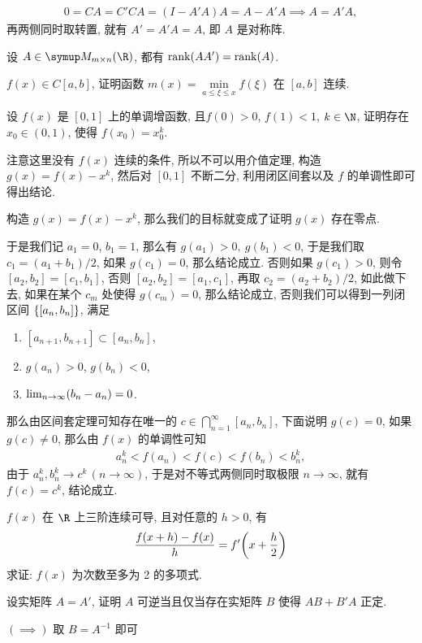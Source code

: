 \begin{exercise}[series=exer]
\begin{answer}
      \begin{align*}
          0 = CA = C'CA = (I - A'A)A = A - A'A \implies A = A'A,
      \end{align*}
      再两侧同时取转置, 就有 $ A' = A'A = A $, 即 $ A $ 是对称阵.
  \end{answer}
  \item 设 $ A \in \MM[\R][m \times n] $, 都有 $ \rank(AA') = \rank(A) $.
  \item $ f(x) \in C[a, b] $, 证明函数 $ m(x) = \min\limits_{a \le \xi \le x}f(\xi) $ 在 $ [a, b] $ 连续.
  \item 设 $ f(x) $ 是 $ [0, 1] $ 上的单调增函数, 且$ f(0) > 0 $, $ f(1) < 1 $, $ k \in \N $, 证明存在 $ x_{0} \in (0, 1) $, 使得 $ f(x_{0}) = x_{0}^{k} $.
  \begin{hint}
      注意这里没有 $ f(x) $ 连续的条件, 所以不可以用介值定理, 构造 $ g(x) = f(x) - x^{k} $, 然后对 $ [0, 1] $ 不断二分, 利用闭区间套以及 $ f $ 的单调性即可得出结论.
  \end{hint}
  \begin{answer}
      构造 $ g(x) = f(x) - x^{k} $, 那么我们的目标就变成了证明 $ g(x) $ 存在零点.

      于是我们记 $ a_{1} = 0 $, $ b_{1} = 1 $, 那么有 $ g(a_{1}) > 0,\ g(b_{1}) < 0 $, 于是我们取 $ c_{1} = (a_{1} + b_{1})/2 $, 如果 $ g(c_{1}) = 0 $, 那么结论成立. 否则如果 $ g(c_{1}) > 0 $, 则令 $ [a_{2}, b_{2}] = [c_{1}, b_{1}] $, 否则 $ [a_{2}, b_{2}] = [a_{1}, c_{1}] $, 再取 $ c_{2} = (a_{2} + b_{2})/2 $, 如此做下去, 如果在某个 $ c_{m} $ 处使得 $ g(c_{m}) = 0 $, 那么结论成立, 否则我们可以得到一列闭区间 $ \qty{[a_{n}, b_{n}]} $, 满足
      \begin{enumerate}
          \item $ [a_{n + 1}, b_{n + 1}] \subset [a_{n}, b_{n}] $,
          \item $ g(a_{n}) > 0 $, $ g(b_{n}) < 0 $,
          \item $ \lim_{n \to \infty}(b_{n} - a_{n}) = 0 $.
      \end{enumerate}
      那么由区间套定理可知存在唯一的 $ c \in \bigcap_{n = 1}^{\infty} [a_{n}, b_{n}] $, 下面说明 $ g(c) = 0 $, 如果 $ g(c) \ne 0 $, 那么由 $ f(x) $ 的单调性可知
      \begin{align*}
          a_{n}^{k} < f(a_{n}) < f(c) < f(b_{n}) < b_{n}^{k},
      \end{align*}
      由于 $ a_{n}^{k}, b_{n}^{k} \to c^{k}\,(n \to \infty) $, 于是对不等式两侧同时取极限 $ n \to \infty $, 就有 $ f(c) = c^{k} $, 结论成立.
  \end{answer}
  \item $ f(x) $ 在 $ \R $ 上三阶连续可导, 且对任意的 $ h > 0 $, 有
  \begin{align*}
      \frac{f(x + h) - f(x)}{h} = f'\qty(x + \frac{h}{2})
  \end{align*}
  求证: $ f(x) $ 为次数至多为 2 的多项式.
  \item 设实矩阵 $ A = A' $, 证明 $ A $ 可逆当且仅当存在实矩阵 $ B $ 使得 $ AB + B'A $ 正定.
  \begin{hint}
      $ (\implies) $ 取 $ B = A^{-1} $ 即可


\end{hint}
\end{exercise}
